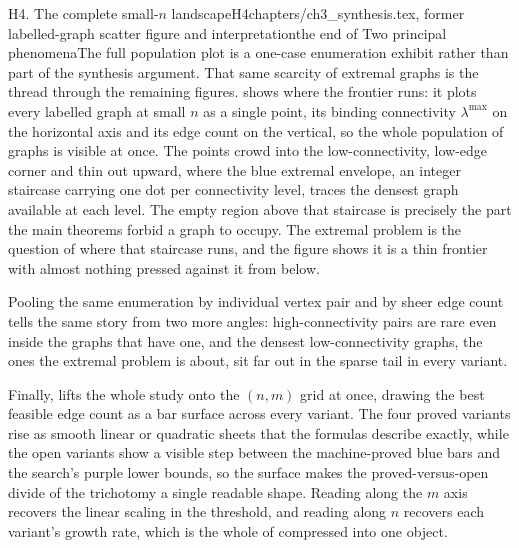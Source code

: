 \begin{offcut}{H4. The complete small-\(n\) landscape}{H4}{chapters/ch3\_synthesis.tex, former labelled-graph scatter figure and interpretation}{the end of Two principal phenomena}{The full population plot is a one-case enumeration exhibit rather than part of the synthesis argument.}
That same scarcity of extremal graphs is the thread through the remaining figures.  shows where the frontier runs: it plots every labelled graph at small $n$ as a single point, its binding connectivity $\lambda^{\max}$ on the horizontal axis and its edge count on the vertical, so the whole population of graphs is visible at once. The points crowd into the low-connectivity, low-edge corner and thin out upward, where the blue extremal envelope, an integer staircase carrying one dot per connectivity level, traces the densest graph available at each level. The empty region above that staircase is precisely the part the main theorems forbid a graph to occupy. The extremal problem is the question of where that staircase runs, and the figure shows it is a thin frontier with almost nothing pressed against it from below.

Pooling the same enumeration by individual vertex pair and by sheer edge count tells the same story from two more angles: high-connectivity pairs are rare even inside the graphs that have one, and the densest low-connectivity graphs, the ones the extremal problem is about, sit far out in the sparse tail in every variant.

Finally,  lifts the whole study onto the $(n, m)$ grid at once, drawing the best feasible edge count as a bar surface across every variant. The four proved variants rise as smooth linear or quadratic sheets that the formulas describe exactly, while the open variants show a visible step between the machine-proved blue bars and the search's purple lower bounds, so the surface makes the proved-versus-open divide of the trichotomy a single readable shape. Reading along the $m$ axis recovers the linear scaling in the threshold, and reading along $n$ recovers each variant's growth rate, which is the whole of  compressed into one object.


\end{offcut}
